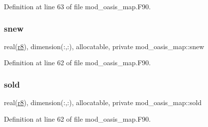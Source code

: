 Definition at line 63 of file mod\+\_\+oasis\+\_\+map.\+F90.

\mbox{\label{namespacemod__oasis__map_a28b59479c467c58995c6300071ca140a}} 
\subsubsection{\texorpdfstring{snew}{snew}}
{\footnotesize\ttfamily real(\hyperlink{namespacemod__oasis__map_a30ebe320b9e4c06a1ee1f2a0bbacf2c4}{r8}), dimension(\+:,\+:), allocatable, private mod\+\_\+oasis\+\_\+map\+::snew\hspace{0.3cm}{\ttfamily [private]}}



Definition at line 62 of file mod\+\_\+oasis\+\_\+map.\+F90.

\mbox{\label{namespacemod__oasis__map_a1fc7e7f295910352524d442c5d0dbf79}} 
\subsubsection{\texorpdfstring{sold}{sold}}
{\footnotesize\ttfamily real(\hyperlink{namespacemod__oasis__map_a30ebe320b9e4c06a1ee1f2a0bbacf2c4}{r8}), dimension(\+:,\+:), allocatable, private mod\+\_\+oasis\+\_\+map\+::sold\hspace{0.3cm}{\ttfamily [private]}}



Definition at line 62 of file mod\+\_\+oasis\+\_\+map.\+F90.


